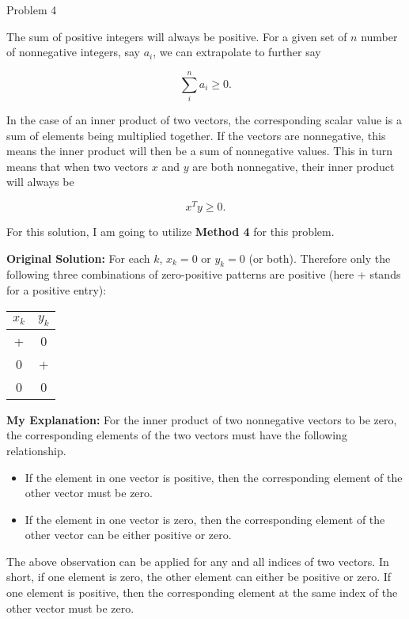 \begin{problem}{Problem 4}
\begin{Highlight}
        The sum of positive integers will always be positive. For a given set of $n$ number of nonnegative integers, say $a_i$, we can extrapolate to further say

        \begin{equation}
            \sum^{n}_{i} a_{i} \geq 0.
        \end{equation}

        In the case of an inner product of two vectors, the corresponding scalar value is a sum of elements being multiplied together. If the vectors are nonnegative, this means the inner product will
        then be a sum of nonnegative values. This in turn means that when two vectors $x$ and $y$ are both nonnegative, their inner product will always be

        \begin{equation}
            x^{T}y \geq 0.
        \end{equation}
    \end{Highlight}

    \begin{Highlight}
        For this solution, I am going to utilize \textbf{Method 4} for this problem. \vspace*{1em}

        \textbf{Original Solution:} For each $k$, $x_k = 0$ or $y_k = 0$ (or both). Therefore only the following three combinations of zero-positive patterns are positive (here + stands for a positive entry):

        \newpage
        \begin{center}
            \begin{tabular}[]{c c}
                $x_{k}$ & $y_{k}$ \\ \hline
                + & 0 \\
                0 & + \\
                0 & 0 \\
            \end{tabular}
        \end{center}
        \textbf{My Explanation:} For the inner product of two nonnegative vectors to be zero, the corresponding elements of the two vectors must have the following relationship.
        \begin{itemize}
            \item If the element in one vector is positive, then the corresponding element of the other vector must be zero.
            \item If the element in one vector is zero, then the corresponding element of the other vector can be either positive or zero.
        \end{itemize}

        The above observation can be applied for any and all indices of two vectors. In short, if one element is zero, the other element can either be positive or zero. If one element is positive, then the corresponding
        element at the same index of the other vector must be zero.
    \end{Highlight}
\end{problem}

